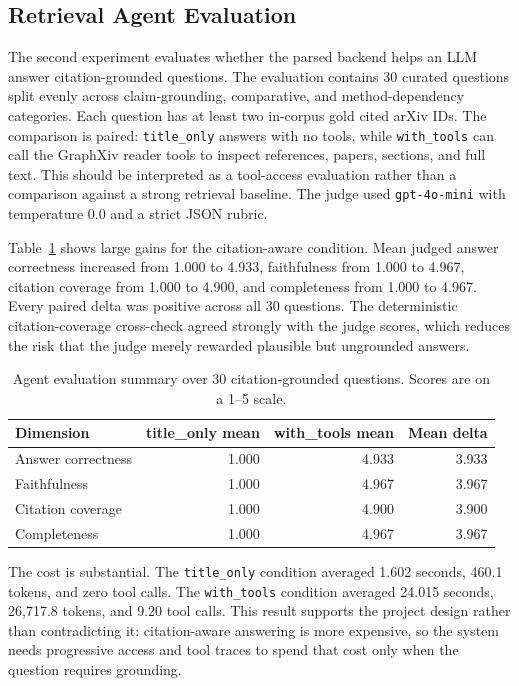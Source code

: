 \documentclass[10pt]{article}
\begin{document}
\subsection{Retrieval Agent Evaluation}

The second experiment evaluates whether the parsed backend helps an LLM answer citation-grounded questions. The evaluation contains 30 curated questions split evenly across claim-grounding, comparative, and method-dependency categories. Each question has at least two in-corpus gold cited arXiv IDs. The comparison is paired: \texttt{title\_only} answers with no tools, while \texttt{with\_tools} can call the GraphXiv reader tools to inspect references, papers, sections, and full text. This should be interpreted as a tool-access evaluation rather than a comparison against a strong retrieval baseline. The judge used \texttt{gpt-4o-mini} with temperature 0.0 and a strict JSON rubric.

Table~\ref{tab:agent-eval} shows large gains for the citation-aware condition. Mean judged answer correctness increased from 1.000 to 4.933, faithfulness from 1.000 to 4.967, citation coverage from 1.000 to 4.900, and completeness from 1.000 to 4.967. Every paired delta was positive across all 30 questions. The deterministic citation-coverage cross-check agreed strongly with the judge scores, which reduces the risk that the judge merely rewarded plausible but ungrounded answers.

\begin{table}[t]
\centering
\small
\caption{Agent evaluation summary over 30 citation-grounded questions. Scores are on a 1--5 scale.}
\label{tab:agent-eval}
\begin{tabular}{lrrr}
\toprule
Dimension & title\_only mean & with\_tools mean & Mean delta \\
\midrule
Answer correctness & 1.000 & 4.933 & 3.933 \\
Faithfulness & 1.000 & 4.967 & 3.967 \\
Citation coverage & 1.000 & 4.900 & 3.900 \\
Completeness & 1.000 & 4.967 & 3.967 \\
\bottomrule
\end{tabular}
\end{table}

The cost is substantial. The \texttt{title\_only} condition averaged 1.602 seconds, 460.1 tokens, and zero tool calls. The \texttt{with\_tools} condition averaged 24.015 seconds, 26,717.8 tokens, and 9.20 tool calls. This result supports the project design rather than contradicting it: citation-aware answering is more expensive, so the system needs progressive access and tool traces to spend that cost only when the question requires grounding.
\end{document}
